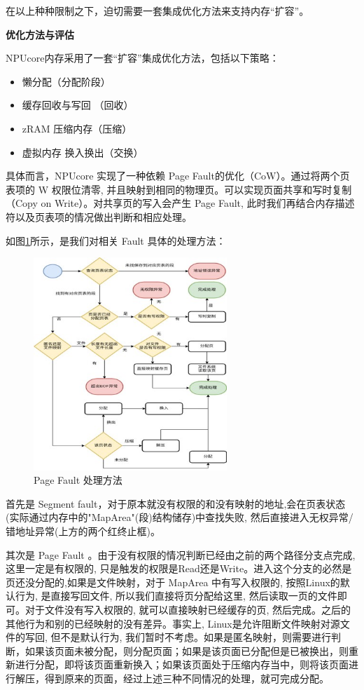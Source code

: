 在以上种种限制之下，迫切需要一套集成优化方法来支持内存“扩容”。 


\textbf{优化方法与评估}

NPUcore内存采用了一套“扩容”集成优化方法，包括以下策略：

\begin{itemize}
	\item 懒分配（分配阶段）
	\item 缓存回收与写回 （回收）
	\item zRAM 压缩内存（压缩）
	\item 虚拟内存 换入换出（交换）
	\end{itemize}

具体而言，NPUcore 实现了一种依赖 Page Fault的优化（CoW）。通过将两个页表项的 W 权限位清零, 并且映射到相同的物理页。可以实现页面共享和写时复制（Copy on Write）。对共享页的写入会产生 Page Fault, 此时我们再结合内存描述符以及页表项的情况做出判断和相应处理。

如图\ref{fig:page fault}所示，是我们对相关 Fault 具体的处理方法：

\begin{figure}[h]
	\centering
	\includegraphics[width=0.65\textwidth]{figures/10-04-Page fault.jpg}
	\caption{Page Fault 处理方法}
	\label{fig:page fault}
\end{figure}

首先是 Segment fault，对于原本就没有权限的和没有映射的地址,会在页表状态(实际通过内存中的"MapArea"(段)结构储存)中查找失败, 然后直接进入无权异常/错地址异常(上方的两个红终止框)。

其次是 Page Fault 。由于没有权限的情况判断已经由之前的两个路径分支点完成, 这里一定是有权限的, 只是触发的权限是Read还是Write。进入这个分支的必然是页还没分配的,如果是文件映射，对于 MapArea 中有写入权限的, 按照Linux的默认行为, 是直接写回文件, 所以我们直接将页分配给这里, 然后读取一页的文件即可。对于文件没有写入权限的, 就可以直接映射已经缓存的页, 然后完成。之后的其他行为和别的已经映射的没有差异。事实上, Linux是允许阻断文件映射对源文件的写回, 但不是默认行为, 我们暂时不考虑。如果是匿名映射，则需要进行判断，如果该页面未被分配，则分配页面；如果是该页面已分配但是已被换出，则重新进行分配，即将该页面重新换入；如果该页面处于压缩内存当中，则将该页面进行解压，得到原来的页面，经过上述三种不同情况的处理，就可完成分配。

